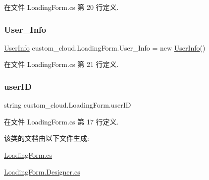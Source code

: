 在文件 Loading\+Form.\+cs 第 20 行定义.

\mbox{\label{classcustom__cloud_1_1_loading_form_a8bbd3d30c46d9c4f9bd2fa2c66e0a8b6}} 
\subsubsection{\texorpdfstring{User\+\_\+\+Info}{User\_Info}}
{\footnotesize\ttfamily \hyperlink{classcustom__cloud_1_1_user_info}{User\+Info} custom\+\_\+cloud.\+Loading\+Form.\+User\+\_\+\+Info = new \hyperlink{classcustom__cloud_1_1_user_info}{User\+Info}()}



在文件 Loading\+Form.\+cs 第 21 行定义.

\mbox{\label{classcustom__cloud_1_1_loading_form_a244c742a2300460159f9a2ef2d1e27a5}} 
\subsubsection{\texorpdfstring{user\+ID}{userID}}
{\footnotesize\ttfamily string custom\+\_\+cloud.\+Loading\+Form.\+user\+ID}



在文件 Loading\+Form.\+cs 第 17 行定义.



该类的文档由以下文件生成\+:\begin{DoxyCompactItemize}
\item 
\hyperlink{_loading_form_8cs}{Loading\+Form.\+cs}\item 
\hyperlink{_loading_form_8_designer_8cs}{Loading\+Form.\+Designer.\+cs}\end{DoxyCompactItemize}
